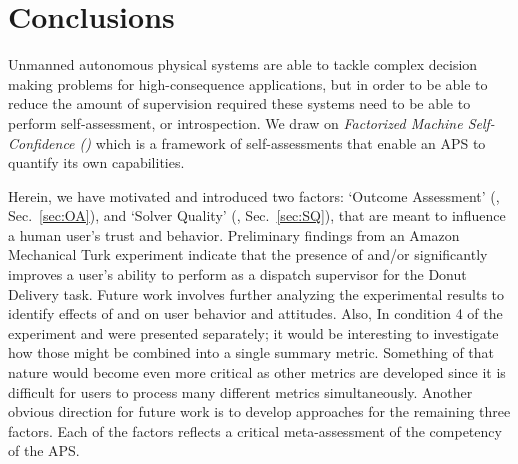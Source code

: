 \section{Conclusions} \label{sec:conclusions}
Unmanned autonomous physical systems are able to tackle complex decision making problems for high-consequence applications, but in order to be able to reduce the amount of supervision required these systems need to be able to perform self-assessment, or introspection. We draw on \emph{Factorized Machine Self-Confidence (\famsec)} which is a framework of self-assessments that enable an APS to quantify its own capabilities.

Herein, we have motivated and introduced two \famsec{} factors: `Outcome Assessment' (\xP{}, Sec.~\ref{sec:OA}), and `Solver Quality' (\xQ{}, Sec.~\ref{sec:SQ}), that are meant to influence a human user's trust and behavior. Preliminary findings from an Amazon Mechanical Turk experiment indicate that the presence of \xQ{} and/or \xP{} significantly improves a user's ability to perform as a dispatch supervisor for the Donut Delivery task. Future work involves further analyzing the experimental results to identify effects of \xQ{} and \xP{} on user behavior and attitudes. Also, In condition 4 of the experiment \xQ{} and \xP{} were presented separately; it would be interesting to investigate how those might be combined into a single summary metric. Something of that nature would become even more critical as other \famsec{} metrics are developed since it is difficult for users to process many different metrics simultaneously. Another obvious direction for future work is to develop approaches for the remaining three \famsec{} factors. Each of the factors reflects a critical meta-assessment of the competency of the APS.
